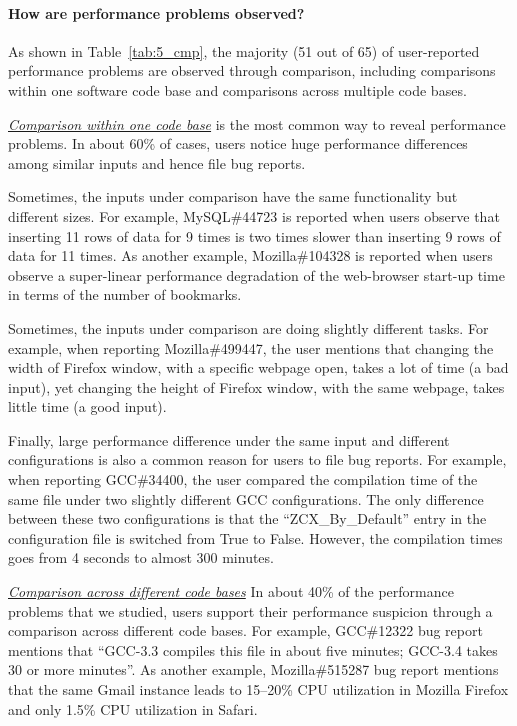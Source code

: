 \paragraph{How are performance problems observed?}

As shown in Table~\ref{tab:5_cmp}, the majority (51 out of 65) of user-reported 
performance problems are observed through comparison, including
comparisons within one software code base and comparisons across multiple code bases.

\underline{\it Comparison within one code base} 
is the most common way to reveal performance problems.  
In about 60\% of cases, 
users notice huge performance differences among
similar inputs and hence file bug reports.

Sometimes, the inputs under comparison have the same functionality but different
sizes. For example, MySQL\#44723 is reported when users observe that inserting
11 rows of data for 9 times is two times slower than inserting 9 rows of data
for 11 times. As another example, Mozilla\#104328 is reported when users observe
a super-linear performance degradation of the web-browser start-up time in terms
of the number of bookmarks.

Sometimes, the inputs under comparison are doing slightly different tasks.
For example, when reporting Mozilla\#499447, the user mentions that changing the width
of Firefox window, with a specific webpage open, takes a lot of time (a bad input), yet
changing the height of Firefox window, with the same webpage,
takes little time (a good 
input).

Finally, large performance difference under the same input and different
configurations is also a common reason for users to file bug reports.
For example, when reporting GCC\#34400, the user compared the compilation time
of the same file under two slightly different GCC configurations.
The only difference between these two configurations is that the ``ZCX\_By\_Default''
entry in the configuration file is switched from True to False. 
However, the compilation times goes from 4 seconds to almost 300 minutes.

\underline{\it Comparison across different code bases} 
In about 40\% of the performance problems that we studied, users support
their performance suspicion through a comparison 
across different code bases. For example, GCC\#12322 bug report mentions
that ``GCC-3.3 compiles this file in about five minutes; GCC-3.4 takes
30 or more minutes''. As another example, Mozilla\#515287 bug report
mentions that the same Gmail instance leads to 15--20\% CPU utilization
in Mozilla Firefox and only 1.5\% CPU utilization in Safari.

